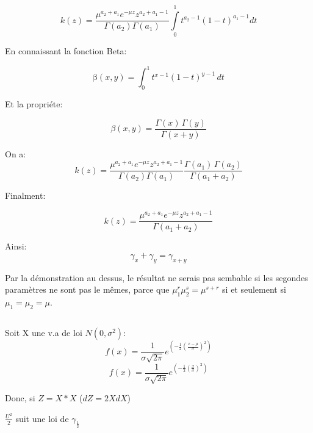 \documentclass[a4paper]{article}
\begin{document}
\begin{equation}
k(z)=\frac{\mu^{a_2+a_1}e^{-\mu z}z^{a_2+a_1-1}}{\Gamma (a_2)\Gamma (a_1)}\int\limits_0^1{t^{a_2-1}}(1-t)^{a_1-1}dt
\end{equation}

En connaissant la fonction Beta:

\begin{equation}
\mathrm{\beta}(x,y) = \int_0^1t^{x-1}(1-t)^{y-1}\,dt
\end{equation}

Et la propriéte:

\begin{equation}
\beta(x,y)=\frac{\Gamma(x)\,\Gamma(y)}{\Gamma(x+y)}
\end{equation}


On a:
\begin{equation}
k(z)=\frac{\mu^{a_2+a_1}e^{-\mu z}z^{a_2+a_1-1}}{\Gamma (a_2)\Gamma (a_1)}\frac{\Gamma(a_1)\,\Gamma(a_2)}{\Gamma(a_1+a_2)}
\end{equation}

Finalment:

\begin{equation}
k(z)=\frac{\mu^{a_2+a_1}e^{-\mu z}z^{a_2+a_1-1}}{\Gamma(a_1+a_2)}
\end{equation}

Ainsi:
\begin{equation}
\gamma_{x}+\gamma_{y}=\gamma_{x+y}
\end{equation}

Par la démonstration au dessus, le résultat ne serais pas sembable si les segondes paramètres ne sont pas le mêmes, parce que 
$\mu_{1}^r \mu_{2}^s = \mu^{s+r}$ si et seulement si $\mu_1=\mu_2=\mu$.

\subsection{}

Soit X une v.a de loi $N(0,\sigma^2)$:
\begin{equation}
f(x)=\frac{1}{\sigma\sqrt{2\pi}}e^{(-\frac{1}{2}(\frac{x-\mu}{\sigma})^2)}
\end{equation}
\begin{equation}
f(x)=\frac{1}{\sigma\sqrt{2\pi}}e^{(-\frac{1}{2}(\frac{x}{\sigma})^2)}
\end{equation}

Donc, si $Z=X*X$ ($dZ=2XdX$)

$\frac{U^2}{2}$ suit une loi de $\gamma_{\frac{1}{2}}$ 
\end{document}
